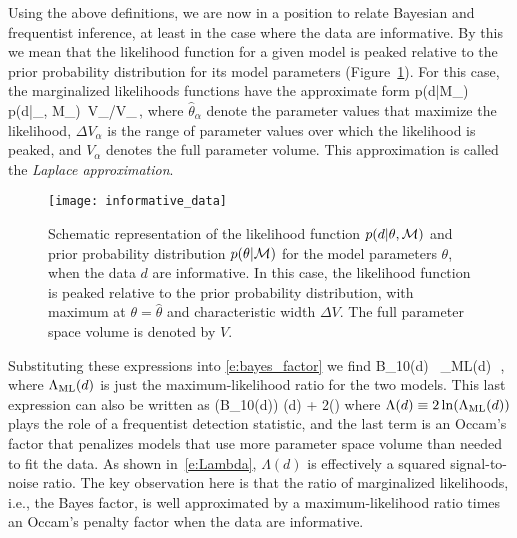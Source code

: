 Using the above definitions, we are now in a position to 
relate Bayesian and frequentist inference, at least in the 
case where the data are informative.
By this we mean that the likelihood function for a given
model is peaked relative to the prior probability 
distribution for its model parameters 
(Figure~\ref{f:informative_data}).
For this case, the marginalized likelihoods functions 
have the approximate form 
%
\be
p(d|{\cal M}_\alpha) 
\simeq
p(d|\hat\theta_\alpha, {\cal M}_\alpha)
\,{\Delta V_\alpha}/{V_\alpha}\,,
\ee
%
where $\hat\theta_\alpha$ denote the parameter values that
maximize the likelihood, $\Delta V_\alpha$ is the range of
parameter values over which the likelihood is peaked, and 
$V_\alpha$ denotes the full parameter volume.
This approximation is called the {\em Laplace approximation}.
%
\begin{figure}[htbp!]
\begin{center}
\texttt{[image: informative\_data]}
\caption{Schematic representation of the likelihood function 
$p(d|\theta,{\cal M})$ and prior probability distribution 
$p(\theta|{\cal M})$ for the model parameters $\theta$,
when the data $d$ are informative.
In this case, the likelihood function is peaked relative to the 
prior probability distribution, with maximum at 
$\theta=\hat\theta$ and characteristic width $\Delta V$.
The full parameter space volume is denoted by $V$.}
\label{f:informative_data}
\end{center}
\end{figure}
%
Substituting these expressions into \eqref{e:bayes_factor} we find
%
\be
{\cal B}_{10}(d) 
\equiv{}
\simeq {}
\,
\simeq\Lambda_{\rm ML}(d)
\,\,,
\ee
where $\Lambda_{\rm ML}(d)$ is just the maximum-likelihood
ratio for the two models.
This last expression can also be written as
%
\ln({\cal B}_{10}(d)) \simeq \Lambda(d) + 
2\ln\left(\right)
\label{e:BF-SNR}
\ee
%
where $\Lambda(d)\equiv 2\ln(\Lambda_{\rm ML}(d))$
plays the role of a frequentist detection statistic, 
and the last term is an Occam's factor that penalizes
models that use more parameter space volume than needed
to fit the data.
As shown in~\eqref{e:Lambda}, $\Lambda(d)$ is effectively
a squared signal-to-noise ratio.
The key observation here is that the ratio of marginalized
likelihoods, i.e., the Bayes factor, 
is well approximated by a maximum-likelihood 
ratio times an Occam's penalty factor when the data are informative.

